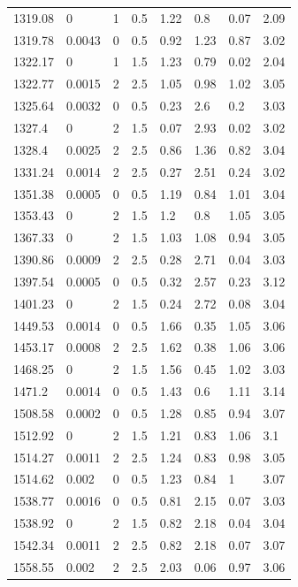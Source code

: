 \begin{longtable}[!h] {p{} p{} p{} p{} p{} p{} p{} p{}}
	1319.08	&	0		&	1	&	0.5	&	1.22	&	0.8		&	0.07	&	2.09    \\
	1319.78	&	0.0043	&	0	&	0.5	&	0.92	&	1.23	&	0.87	&	3.02    \\
	1322.17	&	0		&	1	&	1.5	&	1.23	&	0.79	&	0.02	&	2.04    \\
	1322.77	&	0.0015	&	2	&	2.5	&	1.05	&	0.98	&	1.02	&	3.05    \\
	1325.64	&	0.0032	&	0	&	0.5	&	0.23	&	2.6		&	0.2		&	3.03    \\
	1327.4	&	0		&	2	&	1.5	&	0.07	&	2.93	&	0.02	&	3.02    \\
	1328.4	&	0.0025	&	2	&	2.5	&	0.86	&	1.36	&	0.82	&	3.04    \\
	1331.24	&	0.0014	&	2	&	2.5	&	0.27	&	2.51	&	0.24	&	3.02    \\
	1351.38	&	0.0005	&	0	&	0.5	&	1.19	&	0.84	&	1.01	&	3.04    \\
	1353.43	&	0		&	2	&	1.5	&	1.2		&	0.8		&	1.05	&	3.05    \\
	1367.33	&	0		&	2	&	1.5	&	1.03	&	1.08	&	0.94	&	3.05    \\
	1390.86	&	0.0009	&	2	&	2.5	&	0.28	&	2.71	&	0.04	&	3.03    \\
	1397.54	&	0.0005	&	0	&	0.5	&	0.32	&	2.57	&	0.23	&	3.12    \\
	1401.23	&	0		&	2	&	1.5	&	0.24	&	2.72	&	0.08	&	3.04    \\
	1449.53	&	0.0014	&	0	&	0.5	&	1.66	&	0.35	&	1.05	&	3.06    \\
	1453.17	&	0.0008	&	2	&	2.5	&	1.62	&	0.38	&	1.06	&	3.06    \\
	1468.25	&	0		&	2	&	1.5	&	1.56	&	0.45	&	1.02	&	3.03    \\
	1471.2	&	0.0014	&	0	&	0.5	&	1.43	&	0.6		&	1.11	&	3.14    \\
	1508.58	&	0.0002	&	0	&	0.5	&	1.28	&	0.85	&	0.94	&	3.07    \\
	1512.92	&	0		&	2	&	1.5	&	1.21	&	0.83	&	1.06	&	3.1     \\
	1514.27	&	0.0011	&	2	&	2.5	&	1.24	&	0.83	&	0.98	&	3.05    \\
	1514.62	&	0.002	&	0	&	0.5	&	1.23	&	0.84	&	1		&	3.07    \\
	1538.77	&	0.0016	&	0	&	0.5	&	0.81	&	2.15	&	0.07	&	3.03    \\
	1538.92	&	0		&	2	&	1.5	&	0.82	&	2.18	&	0.04	&	3.04    \\
	1542.34	&	0.0011	&	2	&	2.5	&	0.82	&	2.18	&	0.07	&	3.07    \\
	1558.55	&	0.002	&	2	&	2.5	&	2.03	&	0.06	&	0.97	&	3.06    \\

\end{longtable}
